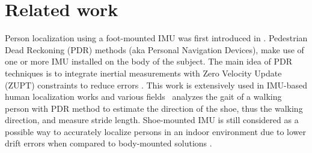 
\section{Related work}\label{sec:relatedWork}

Person localization using a foot-mounted IMU was first introduced in \cite{hutchings1998system}. 
Pedestrian Dead Reckoning (PDR) methods (aka Personal Navigation Devices), make use of one or more IMU installed on the body of the subject.
The main idea of PDR techniques is to integrate inertial measurements with Zero Velocity Update (ZUPT) constraints to reduce errors \cite{ojeda2007personal}.
This work is extensively used in IMU-based human localization works and various fields~\cite{kwanmuang2015phd} analyzes the gait of a walking person 
with PDR method to estimate the direction of the shoe, thus the walking direction, and measure stride length.
Shoe-mounted IMU is still considered as a possible way to
accurately localize persons in an indoor environment due to lower drift errors when compared to body-mounted solutions \cite{groves2007inertial} . 

